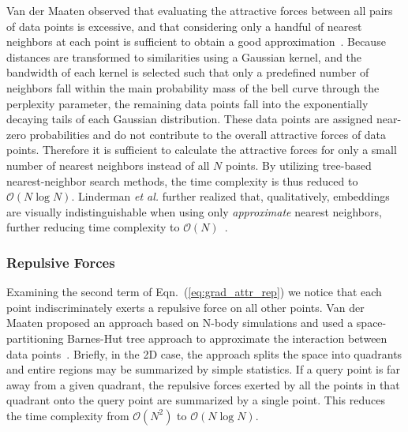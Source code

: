\documentclass[letter]{article}
\begin{document}
Van der Maaten observed that evaluating the attractive forces between all pairs
of data points is excessive, and that considering only a handful of nearest
neighbors at each point is sufficient to obtain a good
approximation~\cite{van2014accelerating}.  Because distances are transformed to
similarities using a Gaussian kernel, and the bandwidth of each kernel is
selected such that only a predefined number of neighbors fall within the main
probability mass of the bell curve through the perplexity parameter, the
remaining data points fall into the exponentially decaying tails of each
Gaussian distribution.  These data points are assigned near-zero probabilities
and do not contribute to the overall attractive forces of data points.
Therefore it is sufficient to calculate the attractive forces for only a small
number of nearest neighbors instead of all $N$ points. By utilizing tree-based
nearest-neighbor search methods, the time complexity is thus reduced to
$\mathcal{O}(N \log N)$. Linderman \textit{et al.} further realized that,
qualitatively, embeddings are visually indistinguishable when using only
\textit{approximate} nearest neighbors, further reducing time complexity to
$\mathcal{O}(N)$~\cite{linderman2019fast}.

\subsubsection*{Repulsive Forces}

Examining the second term of Eqn.~(\ref{eq:grad_attr_rep}) we notice that each
point indiscriminately exerts a repulsive force on all other points. Van der
Maaten proposed an approach based on N-body simulations and used a
space-partitioning Barnes-Hut tree approach to approximate the interaction
between data points~\cite{van2014accelerating}. Briefly, in the 2D case, the
approach splits the space into quadrants and entire regions may be summarized by
simple statistics.  If a query point is far away from a given quadrant, the
repulsive forces exerted by all the points in that quadrant onto the query point
are summarized by a single point. This reduces the time complexity from
$\mathcal{O}(N^2)$ to $\mathcal{O}(N \log N)$.
\end{document}
